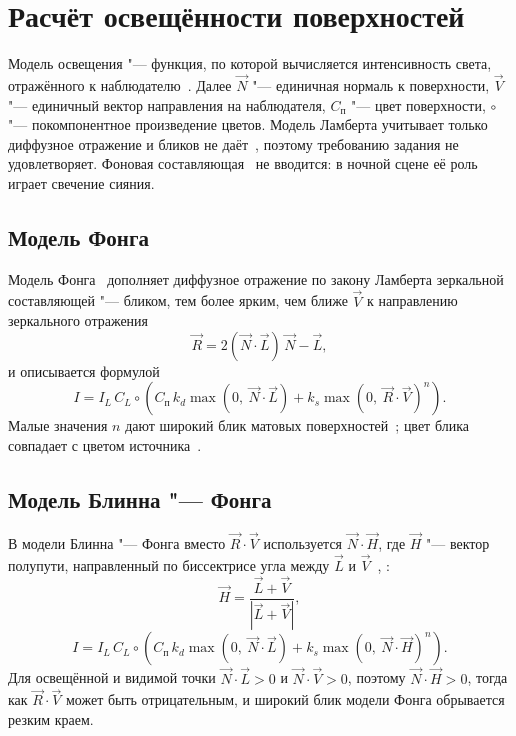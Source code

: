 \section{Расчёт освещённости поверхностей}
\label{sec:lighting}

Модель освещения "--- функция, по которой вычисляется интенсивность света, отражённого к наблюдателю~\cite[с.~380--385]{rogers1989}. Далее $\vec{N}$ "--- единичная нормаль к поверхности, $\vec{V}$ "--- единичный вектор направления на наблюдателя, $C_{\text{п}}$ "--- цвет поверхности, $\circ$ "--- покомпонентное произведение цветов. Модель Ламберта учитывает только диффузное отражение и бликов не даёт~\cite[с.~380]{rogers1989}, поэтому требованию задания не удовлетворяет. Фоновая составляющая~\cite[с.~381]{rogers1989} не вводится: в ночной сцене её роль играет свечение сияния.

\subsection{Модель Фонга}

Модель Фонга~\cite[с.~382--385]{rogers1989} дополняет диффузное отражение по закону Ламберта зеркальной составляющей "--- бликом, тем более ярким, чем ближе $\vec{V}$ к направлению зеркального отражения
\begin{equation}
	\vec{R} = 2 (\vec{N} \cdot \vec{L})\, \vec{N} - \vec{L},
	\label{eq:reflect}
\end{equation}
и описывается формулой
\begin{equation}
	I = I_L\, C_L \circ \left( C_{\text{п}}\, k_d \max(0,\ \vec{N} \cdot \vec{L}) + k_s \max(0,\ \vec{R} \cdot \vec{V})^n \right).
	\label{eq:phong}
\end{equation}
Малые значения $n$ дают широкий блик матовых поверхностей~\cite[с.~383]{rogers1989}; цвет блика совпадает с цветом источника~\cite[с.~384]{rogers1989}.

\subsection{Модель Блинна "--- Фонга}

В модели Блинна "--- Фонга вместо $\vec{R} \cdot \vec{V}$ используется $\vec{N} \cdot \vec{H}$, где $\vec{H}$ "--- вектор полупути, направленный по биссектрисе угла между $\vec{L}$ и $\vec{V}$~\cite[с.~403--404]{rogers1989}, \cite{hearn2005}:
\begin{equation}
	\vec{H} = \frac{\vec{L} + \vec{V}}{|\vec{L} + \vec{V}|},
	\label{eq:halfway}
\end{equation}
\begin{equation}
	I = I_L\, C_L \circ \left( C_{\text{п}}\, k_d \max(0,\ \vec{N} \cdot \vec{L}) + k_s \max(0,\ \vec{N} \cdot \vec{H})^n \right).
	\label{eq:blinn-phong}
\end{equation}
Для освещённой и видимой точки $\vec{N} \cdot \vec{L} > 0$ и $\vec{N} \cdot \vec{V} > 0$, поэтому $\vec{N} \cdot \vec{H} > 0$, тогда как $\vec{R} \cdot \vec{V}$ может быть отрицательным, и широкий блик модели Фонга обрывается резким краем.

